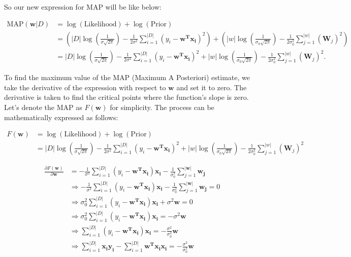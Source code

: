 \documentclass{article}
\begin{document}
\pagebreak

So our new expression for MAP will be like below:

\[
\begin{aligned}
\text{MAP}(\mathbf{w} | D) &= \log(\text{Likelihood}) + \log(\text{Prior}) \\
&= \left(|D| \log\left(\frac{1}{\sigma \sqrt{2\pi}}\right) - \frac{1}{2\sigma^2} \sum_{i=1}^{|D|}(y_i - \mathbf{w^T x_i})^2\right) + \left(|w| \log\left(\frac{1}{\sigma_0 \sqrt{2\pi}}\right) - \frac{1}{2\sigma_0^2} \sum_{j=1}^{|w|} (\mathbf{W}_j)^2\right) \\
&= |D| \log\left(\frac{1}{\sigma \sqrt{2\pi}}\right) - \frac{1}{2\sigma^2} \sum_{i=1}^{|D|}(y_i - \mathbf{w^T x_i})^2 + |w| \log\left(\frac{1}{\sigma_0 \sqrt{2\pi}}\right) - \frac{1}{2\sigma_0^2} \sum_{j=1}^{|w|} (\mathbf{W}_j)^2.
\end{aligned}
\]

\bigskip

To find the maximum value of the MAP (Maximum A Posteriori) estimate, we take the derivative of the expression with respect to $\mathbf{w}$ and set it to zero. The derivative is taken to find the critical points where the function's slope is zero. Let's denote the MAP as $F(\mathbf{w})$ for simplicity. The process can be mathematically expressed as follows:

\[
\begin{aligned}
F(\mathbf{w}) &= \log(\text{Likelihood}) + \log(\text{Prior}) \\
&= |D| \log\left(\frac{1}{\sigma \sqrt{2\pi}}\right) - \frac{1}{2\sigma^2} \sum_{i=1}^{|D|}(y_i - \mathbf{w^T x_i})^2 + |w| \log\left(\frac{1}{\sigma_0 \sqrt{2\pi}}\right) - \frac{1}{2\sigma_0^2} \sum_{j=1}^{|w|} (\mathbf{W}_j)^2
\end{aligned}
\]

\hrulefill

\[
\begin{aligned}
    \frac{\partial F(\mathbf{w})}{\partial \mathbf{w}} &= -\frac{1}{\sigma^2} \sum_{i=1}^{|D|}(y_i - \mathbf{w^T x_i})\mathbf{x_i} - \frac{1}{\sigma_0^2} \sum_{j=1}^{|\mathbf{w}|}\mathbf{w_j} \\
    &\Rightarrow -\frac{1}{\sigma^2} \sum_{i=1}^{|D|}(y_i - \mathbf{w^T x_i})\mathbf{x_i} - \frac{1}{\sigma_0^2} \sum_{j=1}^{|\mathbf{w}|}\mathbf{w_j} = 0 \\
    &\Rightarrow \sigma_0^2 \sum_{i=1}^{|D|}(y_i - \mathbf{w^T x_i})\mathbf{x_i} + \sigma^2 \mathbf{w} = 0 \\
    &\Rightarrow \sigma_0^2 \sum_{i=1}^{|D|}(y_i - \mathbf{w^T x_i})\mathbf{x_i} = - \sigma^2 \mathbf{w} \\
    &\Rightarrow \sum_{i=1}^{|D|}(y_i - \mathbf{w^T x_i})\mathbf{x_i} = -\frac{\sigma^2}{\sigma_0^2} \mathbf{w} \\
    & \Rightarrow \sum_{i=1}^{|D|}\mathbf{x_i y_i} - \sum_{i=1}^{|D|}\mathbf{w^T x_i}\mathbf{x_i} = -\frac{\sigma^2}{\sigma_0^2} \mathbf{w}
\end{aligned}
\]
\end{document}
